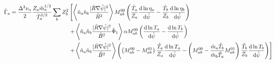 \documentclass[12pt, a4paper]{article}
\renewcommand{\d}{\ensuremath{\mathrm{d}}}
\newcommand{\lang}{\left\langle}
\newcommand{\rang}{\right\rangle}
\begin{document}
\begin{equation}
\begin{aligned}
  \hspace*{-10ex} \hat{\Gamma}_a =   \frac{\Delta^2 \nu_n}{2}\frac{Z_a\hat{m}_a^{1/2}}{\hat{T}_a^{3/2}}\sum_b Z_b^2 &\left[
    \lang  \hat{n}_a \hat{n}_b\frac{ |\bar{R}\nabla \hat{\psi}|^2}{\hat{B}^2} \rang M_{ab}^{00} \left(\frac{ \hat{T}_a}{Z_a}  \frac{\d \ln\eta_a}{\d \hat{\psi}} -\frac{ \hat{T}_b}{Z_b}  \frac{\d \ln\eta_b}{\d \hat{\psi}}\right) \right.\\
    &\left.+    \lang \hat{n}_a \hat{n}_b\frac{  |\bar{R}\nabla \hat{\psi}|^2}{\hat{B}^2} \hat{\Phi}_1 \rang \alpha  M_{ab}^{00} \left(\frac{\d \ln T_a}{\d \hat{\psi}} -\frac{\d \ln T_b}{\d \hat{\psi}}\right) \right.\\
   &\left. + \lang \hat{n}_a \hat{n}_b \frac{| \bar{R} \nabla \hat{\psi}|^2 }{\hat{B}^2}\rang\left(  \left(M_{ab}^{00} - M_{ab}^{01}\right)\frac{ \hat{T}_a}{Z_a}\frac{\d \ln T_a}{\d \hat{\psi}} 
    - \left(M_{ab}^{00} - \frac{\hat{m}_a \hat{T}_b}{\hat{m}_b \hat{T}_a} M_{ab}^{01}\right)\frac{ \hat{T}_b}{Z_b}\frac{\d \ln T_b}{\d \hat{\psi}}\right)\right] 
\end{aligned}
\end{equation}
\end{document}
